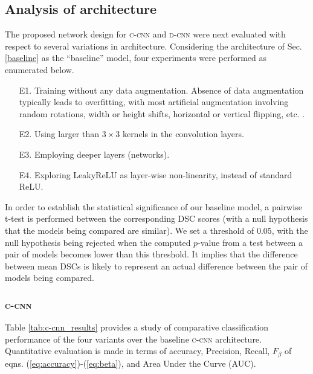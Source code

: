 \documentclass[journal,twocolumn]{IEEEtran}
\begin{document}
\subsection{Analysis of architecture}

 The proposed network design for {\scshape{c-cnn}} and {\scshape{d-cnn}} were next evaluated with respect to several variations  in architecture. Considering the architecture of Sec. \ref{baseline} as the ``baseline'' model, four experiments were performed as enumerated below.

\begin{enumerate}
 	\item[E1.] Training without any data augmentation. Absence of data augmentation typically leads to overfitting,  with most artificial augmentation involving random rotations, width or height shifts, horizontal  or vertical  flipping, etc. \cite{Pereira2016}.
  	\item[E2.] Using larger than $3 \times 3$  kernels in the convolution layers.
    \item[E3.] Employing deeper layers (networks).
    \item[E4.] Exploring LeakyReLU \cite{Maas2013_lrelu} as layer-wise non-linearity, instead of standard ReLU.
\end{enumerate}

In order to establish the statistical significance of our baseline model, a pairwise t-test is performed between the corresponding DSC scores (with a null hypothesis that the models being compared are similar).
We set a  threshold of $0.05$, with the null hypothesis being rejected when  the computed $p$-value from a test between a pair of  models becomes  lower than this threshold. It implies that the difference between mean DSCs is likely to represent an actual difference between the pair of  models being compared.

\subsubsection{ \mbox{\scshape{c-cnn}}} Table \ref{tab:c-cnn_results} provides a  study of comparative classification performance  of the four variants over the baseline  {\scshape{c-cnn}} architecture. Quantitative evaluation is made in terms of accuracy,   Precision, Recall, $F_{\beta}$  of eqns. (\ref{eq:accuracy})-(\ref{eq:beta}), and Area Under the Curve (AUC).
\end{document}
